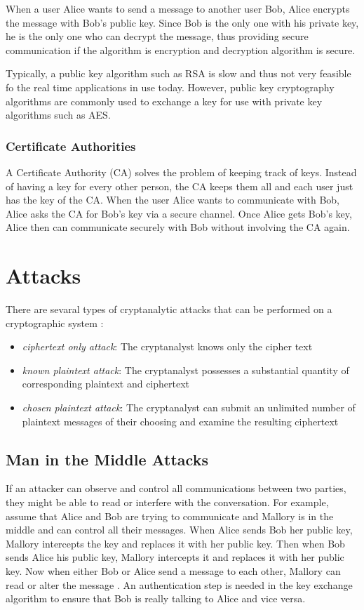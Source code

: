 \documentclass[12pt]{article}
\begin{document}
When a user Alice wants to send a message to another user Bob, Alice encrypts the message with Bob's public key. Since Bob is the only one with his private key, he is the only one who can decrypt the message, thus providing secure communication if the algorithm is encryption and decryption algorithm is secure.

Typically, a public key algorithm such as RSA is slow and thus not very feasible fo the real time applications in use today. However, public key cryptography algorithms are commonly used to exchange a key for use with private key algorithms such as AES.

\subsubsection{Certificate Authorities}
A Certificate Authority (CA) solves the problem of keeping track of keys. Instead of having a key for every other person, the CA keeps them all and each user just has the key of the CA. When the user Alice wants to communicate with Bob, Alice asks the CA for Bob's key via a secure channel. Once Alice gets Bob's key, Alice then can communicate securely with Bob without involving the CA again.

\section{Attacks}

There are sevaral types of cryptanalytic attacks that can be performed on a cryptographic system \cite{diffiehellman}:
\begin{itemize}
	\item{\textit{ciphertext only attack}: The cryptanalyst knows only the cipher text}
	\item{\textit{known plaintext attack}: The cryptanalyst possesses a substantial quantity of corresponding plaintext and ciphertext}
	\item{\textit{chosen plaintext attack}: The cryptanalyst can submit an unlimited number of plaintext messages of their choosing and examine the resulting ciphertext}
\end{itemize}

\subsection{Man in the Middle Attacks}
If an attacker can observe and control all communications between two parties, they might be able to read or interfere with the conversation. For example, assume that Alice and Bob are trying to communicate and Mallory is in the middle and can control all their messages. When Alice sends Bob her public key, Mallory intercepts the key and replaces it with her public key. Then when Bob sends Alice his public key, Mallory intercepts it and replaces it with her public key. Now when either Bob or Alice send a message to each other, Mallory can read or alter the message \cite[pg. 48]{appcrypt}. An authentication step is needed in the key exchange algorithm to ensure that Bob is really talking to Alice and vice versa.
\end{document}
